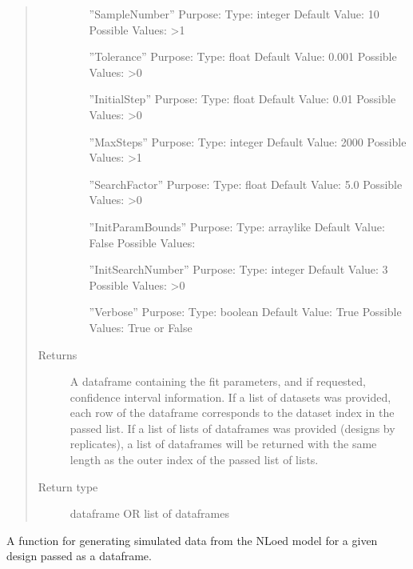 \documentclass[letterpaper,10pt,english,openany,oneside]{sphinxmanual}
\begin{document}
\begin{fulllineitems}
\begin{fulllineitems}
\begin{quote}
\begin{description}
\begin{itemize}
”SampleNumber” \textendash{}
Purpose:
Type: integer
Default Value: 10
Possible Values: \textgreater{}1

”Tolerance” \textendash{}
Purpose:
Type: float
Default Value: 0.001
Possible Values: \textgreater{}0

”InitialStep” \textendash{}
Purpose:
Type: float
Default Value: 0.01
Possible Values: \textgreater{}0

”MaxSteps” \textendash{}
Purpose:
Type: integer
Default Value: 2000
Possible Values: \textgreater{}1

”SearchFactor” \textendash{}
Purpose:
Type: float
Default Value: 5.0
Possible Values: \textgreater{}0

”InitParamBounds” \textendash{}
Purpose:
Type: array\sphinxhyphen{}like
Default Value: False
Possible Values:

”InitSearchNumber” \textendash{}
Purpose:
Type: integer
Default Value: 3
Possible Values: \textgreater{}0

”Verbose” \textendash{}
Purpose:
Type: boolean
Default Value: True
Possible Values: True or False


\end{itemize}

\item[{Returns}] \leavevmode
A dataframe containing the fit parameters,
and if requested, confidence interval information. If a list of datasets was provided,
each row of the dataframe corresponds to the dataset index in the passed list.
If a list of lists of dataframes was provided (designs by replicates),
a list of dataframes will be returned with the same length as the outer index of the
passed list of lists.

\item[{Return type}] \leavevmode
dataframe OR list of dataframes

\end{description}\end{quote}

\end{fulllineitems}


\begin{fulllineitems}
\label{\detokenize{nloed:nloed.model.Model.sample}}
A function for generating simulated data from the NLoed model for a given design passed
as a dataframe.


\end{fulllineitems}
\end{fulllineitems}
\end{document}
